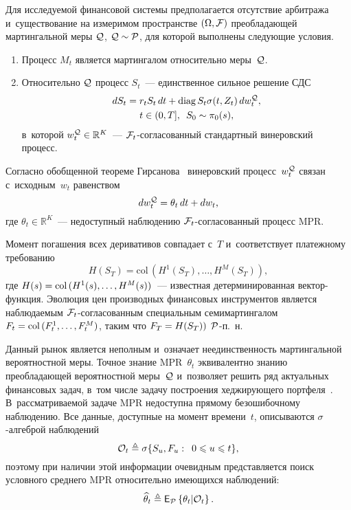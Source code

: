 \begin{multicols}{2}
  Для исследуемой финансовой сис\-те\-мы предполагается отсутствие арбитража~\cite{Criens_20} 
  и~существование на измеримом пространстве $(\Omega, {\mathcal F})$ преобладающей мартингальной меры ${\mathcal Q}$, $\qqq \hm\sim \ppp$,
   для которой выполнены следующие условия.
  \begin{enumerate}[1.]
  \item
  Процесс $M_t$ является мартингалом относительно меры~${\mathcal Q}$.
  \item
  Относительно ${\mathcal Q}$ процесс $S_t$~--- единственное сильное решение СДС
  \begin{multline}
  dS_t =r_t S_t \,dt + \mathrm{diag}\,S_t \sigma(t,Z_t)\,dw_t^{{\mathcal Q}},\\
   t \in (0,T], \enskip S_0 \sim \pi_0(s),
  \label{eq:S_sys_Q}
  \end{multline}
  в~которой $w_t^{\qqq} \hm\in \mathbb{R}^K$~--- ${\mathcal F}_t$-со\-гла\-со\-ван\-ный стандартный винеровский процесс.
  \end{enumerate}
  Согласно обобщенной теореме Гирсанова~\cite{KE_15} винеровский процесс~$w_t^{{\mathcal Q}}$ связан с~исходным~$w_t$ равенством
   \begin{equation}
  dw_t^{{\mathcal Q}} = \theta_t\,dt + dw_t,
  \label{eq:w_con}
  \end{equation}
  где $\theta_t \in \mathbb{R}^K$~--- недоступный наблюдению ${\mathcal F}_t$-со\-гла\-со\-ван\-ный процесс MPR.

Момент погашения всех деривативов совпадает с~$T$ и~соответствует
платежному требованию 
$$
H(S_T) = \mathrm{col}\,(H^1(S_T),\ldots, H^M(S_T)),
$$
 где $H(s) \hm= \mathrm{col}\,(H^1(s),\ldots, H^M(s))$~--- 
известная детерминированная век\-тор-функ\-ция.
Эволюция цен производных финансовых инструментов является наблюдаемым ${\mathcal F}_t$-со\-гла\-со\-ван\-ным специальным семимартингалом 
$F_t \hm= \mathrm{col}\,(F_t^1, \ldots, F_t^M)$,  таким что $F_T \hm= H(S_T))$ ${\mathcal P}$-п.~н.

Данный рынок является неполным и~означает неединственность мартингальной вероятностной меры. 
Точное знание MPR~$\theta_t$ эквивалентно знанию преобладающей вероятностной меры~${\mathcal Q}$ и~позволяет решить ряд актуальных финансовых задач, 
в~том числе задачу построения хеджирующего портфеля~\cite{B_98, Sh_98}. В~рас\-смат\-ри\-ва\-емой задаче MPR 
недоступна прямому безошибочному наблюдению. Все данные, доступные на момент времени~$t$, описываются $\sigma$-ал\-геб\-рой 
наблюдений 
$$
\mathcal{O}_t \ebd \sigma\{S_u, F_u: \enskip 0  \leqslant u \hm\leqslant t\},
$$ 
поэтому при наличии этой информации очевидным представляется поиск условного среднего MPR относительно имеющихся наблюдений: 
$$
\widehat{\theta}_t \triangleq \mathsf{E}_{ {\mathcal P} }\left\{ \mathop{\theta_t | \mathcal{O}_t} \right\}.
$$


\end{multicols}
